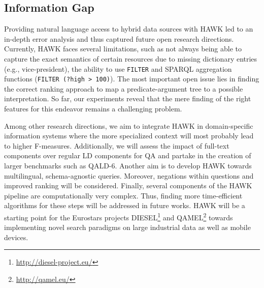 \subsection*{Information Gap}

Providing natural language access to hybrid data sources with HAWK led to an in-depth error analysis and thus captured future open research directions.
Currently, HAWK faces several limitations, such as not always being able to capture the exact semantics of certain resources due to missing dictionary entries (e.g., vice-president), the ability to use \texttt{FILTER} and SPARQL aggregation functions (\texttt{FILTER (?high > 100)}). 
The most important open issue lies in finding the correct ranking approach to map a predicate-argument tree to a possible interpretation. 
So far, our experiments reveal that the mere finding of the right features for this endeavor remains a challenging problem. 

Among other research directions, we aim to integrate HAWK in domain-specific information systems where the more specialized context will most probably lead to higher F-measures. 
Additionally, we will assess the impact of full-text components over regular LD components for \ac{QA} and partake in the creation of larger benchmarks such as \ac{QALD}-6.
Another aim is to develop HAWK towards multilingual, schema-agnostic queries.
Moreover, negations within questions and improved ranking will  be considered. 
Finally, several components of the HAWK pipeline are computationally very complex. 
Thus, finding more time-efficient algorithms for these steps will be addressed in future works.
HAWK will be a starting point for the Eurostars projects DIESEL\footnote{\url{http://diesel-project.eu/}} and QAMEL\footnote{\url{http://qamel.eu/}} towards implementing novel search paradigms on large industrial data as well as mobile devices.

\bigskip

